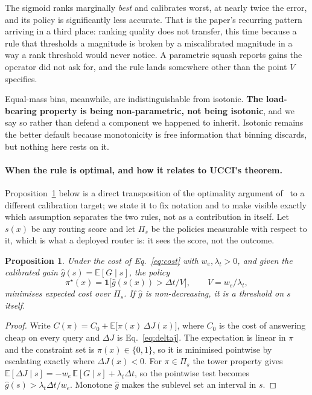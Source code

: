 \documentclass[10pt,twocolumn]{article}
\theoremstyle{plain}
\newtheorem{proposition}{Proposition}
\begin{document}
The sigmoid ranks marginally \emph{best} and calibrates worst, at nearly twice
the error, and its policy is significantly less accurate. That is the paper's
recurring pattern arriving in a third place: ranking quality does not transfer,
this time because a rule that thresholds a magnitude is broken by a
miscalibrated magnitude in a way a rank threshold would never notice. A
parametric squash reports gains the operator did not ask for, and the rule
lands somewhere other than the point $V$ specifies.

Equal-mass bins, meanwhile, are indistinguishable from isotonic. \textbf{The
load-bearing property is being non-parametric, not being isotonic}, and we say
so rather than defend a component we happened to inherit. Isotonic remains the
better default because monotonicity is free information that binning discards,
but nothing here rests on it.

\paragraph{When the rule is optimal, and how it relates to UCCI's theorem.}
Proposition~\ref{prop:pointwise} below is a direct transposition of the optimality argument
of~\cite{ucci} to a different calibration target; we state it to fix notation
and to make visible exactly which assumption separates the two rules, not as a
contribution in itself. Let $s(x)$ be any routing score and
let $\Pi_s$ be the policies measurable with respect to it, which is what a
deployed router is: it sees the score, not the outcome.

\begin{proposition}
\label{prop:pointwise}
Under the cost of Eq.~\ref{eq:cost} with
$w_e, \lambda_t > 0$, and given the calibrated gain $\hat g(s) = \mathbb{E}[G
\mid s]$, the policy
\[
\pi^\star(x) = \mathbf{1}\bigl[\hat g(s(x)) > \Delta t / V\bigr],
\qquad V = w_e/\lambda_t,
\]
minimises expected cost over $\Pi_s$. If $\hat g$ is non-decreasing, it is
a threshold on $s$ itself.
\end{proposition}

\begin{proof} Write $C(\pi) = C_0 + \mathbb{E}\bigl[\pi(x)\,\Delta
J(x)\bigr]$, where $C_0$ is the cost of answering cheap on every query and
$\Delta J$ is Eq.~\ref{eq:deltaj}. The expectation is linear in $\pi$ and the
constraint set is $\pi(x) \in \{0,1\}$, so it is minimised pointwise by
escalating exactly where $\Delta J(x) < 0$. For $\pi \in \Pi_s$ the tower
property gives $\mathbb{E}[\Delta J \mid s] = -w_e\,\mathbb{E}[G \mid s] +
\lambda_t \Delta t$, so the pointwise test becomes $\hat g(s) > \lambda_t \Delta
t / w_e$. Monotone $\hat g$ makes the sublevel set an interval in $s$.
\end{proof}
\end{document}
